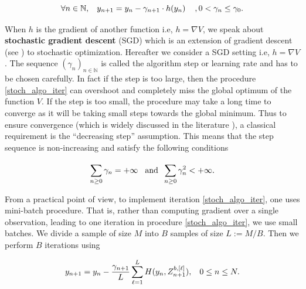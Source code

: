\documentclass{article}
\newcommand{\q}[1]{``#1''}
\renewcommand{\q}[1]{``#1''}
\numberwithin{equation}{section}
\begin{document}
\begin{equation}
    \forall n \in \mathbb{N}, \hspace{0.3cm} y_{n+1} = y_n - \gamma_{n+1} \cdot h(y_n) \hspace{0.4cm}, 0 < \gamma_n \le \gamma_0.
    \label{stoch_algo_iter}
\end{equation}

\noindent
When $h$ is the gradient of another function i.e, $h = \nabla V$, we speak about \textbf{stochastic gradient descent} (SGD) which is an extension of gradient descent (see \cite{Rumelhart1986LearningIR}) to stochastic optimization. Hereafter we consider a SGD setting i.e, $h= \nabla V$. The sequence $(\gamma_n)_{n \in \mathbb{N}}$ is called the algorithm step or learning rate and has to be chosen carefully. In fact if the step is too large, then the procedure \eqref{stoch_algo_iter} can overshoot and completely miss the global optimum of the function $V$. If the step is too small, the procedure may take a long time to converge as it will be taking small steps towards the global minimum. Thus to ensure convergence (which is widely discussed in the literature \cite{EonBottou1998OnlineLA, pmlr-v84-chee18a, Robbins1971ACT}), a classical requirement is the \q{decreasing step} assumption. This means that the step sequence is non-increasing and satisfy the following conditions

\begin{equation}
\label{hyp_DS}
\sum_{n\ge0}^{} \gamma_n = +\infty \hspace{0.3cm} \text{and} \hspace{0.2cm} \sum_{n\ge0}^{} \gamma_n^2 < +\infty.
\end{equation}




From a practical point of view, to implement iteration \eqref{stoch_algo_iter}, one uses mini-batch procedure. That is, rather than computing gradient over a single observation, leading to one iteration in procedure \eqref{stoch_algo_iter}, we use small batches. We divide a sample of size $M$ into $B$ samples of size $L := M / B$. Then we perform $B$ iterations using

\begin{equation}
\label{iter_sgd_MC_mini_batch}
    y_{n+1} = y_n -  \frac{\gamma_{n+1}}{L} \sum_{\ell = 1}^{L} H(y_n, Z_{n+1}^{b, [\ell]}), \hspace{0.3cm} 0 \le n \le N.
\end{equation}
\end{document}
